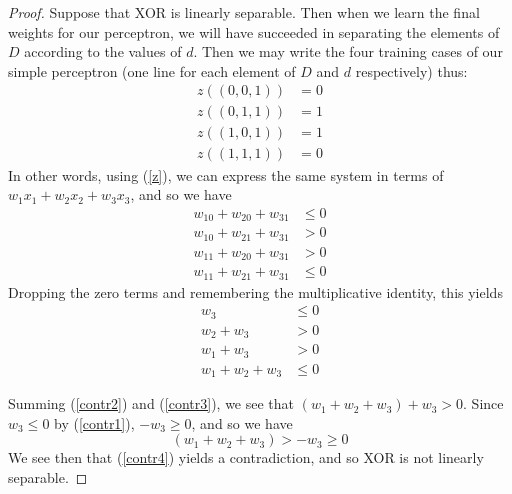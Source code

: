 \documentclass[12 pt]{report}
\begin{document}
\begin{proof}
  Suppose that XOR is linearly separable.  Then when we learn the
  final weights for our perceptron, we will have succeeded in
  separating the elements of $D$ according to the values of $d$.  Then
  we may write the four training cases of our simple perceptron (one
  line for each element of $D$ and $d$ respectively) thus:
  \begin{align*}
    z((0,0,1)) & = 0 \\
    z((0,1,1)) & = 1 \\
    z((1,0,1)) & = 1 \\
    z((1,1,1)) & = 0
  \end{align*}
  In other words, using (\ref{z}), we can express the same system in
  terms of $w_1x_1 + w_2x_2 + w_3x_3$, and so we have
  \begin{align*}
    w_10 + w_20 + w_31 & \le 0 \\
    w_10 + w_21 + w_31  & > 0 \\
    w_11 + w_20 + w_31  & > 0 \\
    w_11 + w_21 + w_31  & \le 0
  \end{align*}
  Dropping the zero terms and remembering the multiplicative identity,
  this yields
  \begin{align}
    \label{contr1}
    w_3 & \le 0 \\
    \label{contr2}
    w_2 + w_3  & > 0 \\
    \label{contr3}
    w_1 + w_3   & > 0 \\
    \label{contr4}
    w_1 + w_2  + w_3 & \le 0
\end{align}

Summing (\ref{contr2}) and (\ref{contr3}), we see that
$(w_1+w_2+w_3) + w_3 > 0$.  Since $w_3\le 0$ by (\ref{contr1}),
$-w_3\ge 0$, and so we have
\begin{displaymath}
  (w_1+w_2+w_3) > -w_3 \ge 0
\end{displaymath}
We see then that (\ref{contr4}) yields a contradiction, and so XOR is
not linearly separable.

\end{proof}
\end{document}
